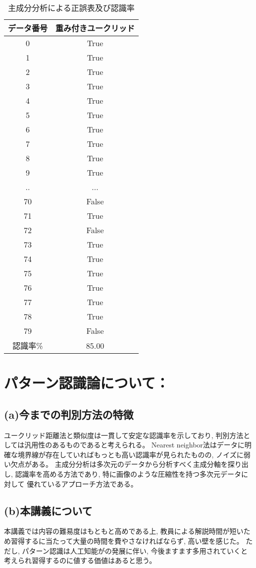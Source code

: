 \documentclass[twocolumn, 10.5pt]{jsarticle}
\begin{document}
\begin{table}[htbp]
  \caption{主成分分析による正誤表及び認識率}
  \centering
  \begin{tabular}{|c||c|}\hline
    データ番号 & 重み付きユークリッド \\\hline\hline
    0 & True \\\hline
    1 & True \\\hline
    2 & True \\\hline
    3 & True \\\hline
    4 & True \\\hline
    5 & True \\\hline
    6 & True \\\hline
    7 & True \\\hline
    8 & True \\\hline
    9 & True \\\hline
    .. & ... \\\hline
    70 & False \\\hline
    71 & True \\\hline
    72 & False \\\hline
    73 & True \\\hline
    74 & True \\\hline
    75 & True \\\hline
    76 & True \\\hline
    77 & True \\\hline
    78 & True \\\hline
    79 & False \\\hline\hline
    認識率\% & 85.00 \\\hline
  \end{tabular}
\end{table}


\section{パターン認識論について：}
\subsection{(a)今までの判別方法の特徴}
ユークリッド距離法と類似度は一貫して安定な認識率を示しており, 判別方法としては汎用性のあるものであると考えられる。
Nearest neighbor法はデータに明確な境界線が存在していればもっとも高い認識率が見られたものの, ノイズに弱い欠点がある。
主成分分析は多次元のデータから分析すべく主成分軸を探り出し, 認識率を高める方法であり, 特に画像のような圧縮性を持つ多次元データに対して
優れているアプローチ方法である。

\subsection{(b)本講義について}
本講義では内容の難易度はもともと高めである上, 教員による解説時間が短いため習得するに当たって大量の時間を費やさなければならず, 高い壁を感じた。
ただし, パターン認識は人工知能がの発展に伴い, 今後ますます多用されていくと考えられ習得するのに値する価値はあると思う。
\end{document}
